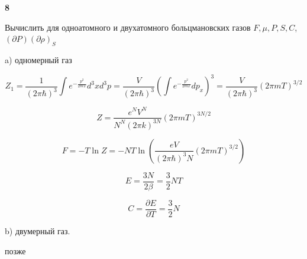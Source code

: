\documentclass[a4paper,12pt]{article} %
\newcommand{\parder}[2]{\frac{\partial {#1}}{\partial {#2}}}
\begin{document}
\begin{ttask}\textbf{8}

Вычислить для одноатомного и двухатомного больцмановских газов 
$ F, \mu, P, S, C$, $(\partial P)(\partial \rho)_{S}$


a) одномерный газ



\[ Z_1=\frac{1}{(2\pi\hbar)^3}\int e^{-\frac{p^2}{2mT}}d^3 xd^3 p=\frac{V}{(2\pi\hbar)^3} \left(\int e^{-\frac{p^2}{2mT}}dp_x\right)^3=
	\frac{V}{(2\pi\hbar)^3} (2\pi m T)^{3/2}\]

\[ Z=\frac{e^{N} V^{N}}{N^{N}(2 \pi k)^{3 N}}(2 \pi m T)^{3 N / 2} \]

\[ F=-T\ln Z =-NT\ln \left( \frac{eV}{(2\pi\hbar)^3 N}(2\pi m T)^{3/2} \right)\]

\[ E=\frac{3N}{2\beta}=\frac{3}{2}NT \]



\[ C=\parder{E}{T}=\frac{3}{2}N \]


b) двумерный газ.

позже





\end{ttask}
\end{document}
